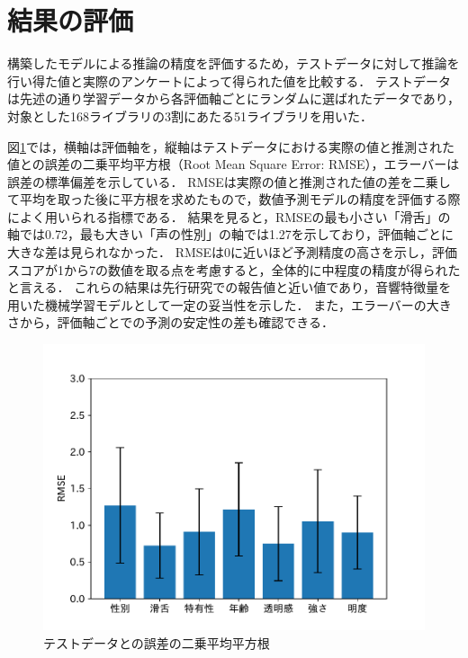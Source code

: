 \section{結果の評価}
\label{sec:eval}

構築したモデルによる推論の精度を評価するため，テストデータに対して推論を行い得た値と実際のアンケートによって得られた値を比較する．
テストデータは先述の通り学習データから各評価軸ごとにランダムに選ばれたデータであり，対象とした168ライブラリの3割にあたる51ライブラリを用いた．

図\ref{tab:score_box}では，横軸は評価軸を，縦軸はテストデータにおける実際の値と推測された値との誤差の二乗平均平方根（Root Mean Square Error: RMSE），エラーバーは誤差の標準偏差を示している．
RMSEは実際の値と推測された値の差を二乗して平均を取った後に平方根を求めたもので，数値予測モデルの精度を評価する際によく用いられる指標である．
結果を見ると，RMSEの最も小さい「滑舌」の軸では0.72，最も大きい「声の性別」の軸では1.27を示しており，評価軸ごとに大きな差は見られなかった．
RMSEは0に近いほど予測精度の高さを示し，評価スコアが1から7の数値を取る点を考慮すると，全体的に中程度の精度が得られたと言える．
これらの結果は先行研究\cite{dnn}での報告値と近い値であり，音響特徴量を用いた機械学習モデルとして一定の妥当性を示した．
また，エラーバーの大きさから，評価軸ごとでの予測の安定性の差も確認できる．

\begin{figure}[htb]
  \centering
  \includegraphics[width=\linewidth]{fig/rmse.pdf}
  \caption{テストデータとの誤差の二乗平均平方根}
  \label{tab:score_box}
\end{figure}

